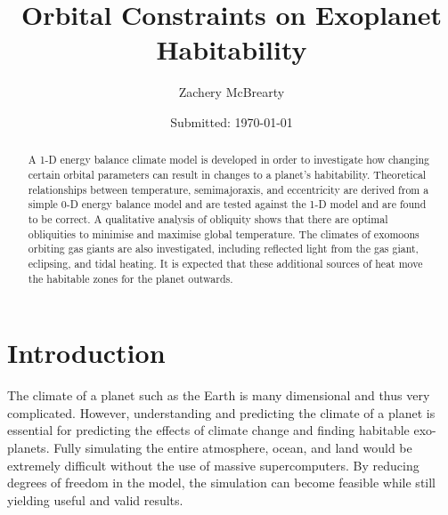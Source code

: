 \documentclass[12pt, onecolumn]{revtex4-2}    %
\begin{document}
\title{Orbital Constraints on Exoplanet Habitability}
\date{Submitted: \today{}}
\author{Zachery McBrearty}

\begin{abstract}

    A 1-D energy balance climate model is developed in order to investigate how changing certain orbital parameters can result in changes to a planet's habitability.
    Theoretical relationships between temperature, semimajoraxis, and eccentricity are derived from a simple 0-D energy balance model and are tested against the 1-D model and are found to be correct.
    A qualitative analysis of obliquity shows that there are optimal obliquities to minimise and maximise global temperature.
    The climates of exomoons orbiting gas giants are also investigated, including reflected light from the gas giant, eclipsing, and tidal heating.
    It is expected that these additional sources of heat move the habitable zones for the planet outwards.

\end{abstract}


\maketitle

\tableofcontents

\newpage

\section{Introduction}

The climate of a planet such as the Earth is many dimensional and thus very complicated.
However, understanding and predicting the climate of a planet is essential for predicting the effects of climate change and finding habitable exo-planets.
Fully simulating the entire atmosphere, ocean, and land would be extremely difficult without the use of massive supercomputers.
By reducing degrees of freedom in the model, the simulation can become feasible while still yielding useful and valid results.
\end{document}
